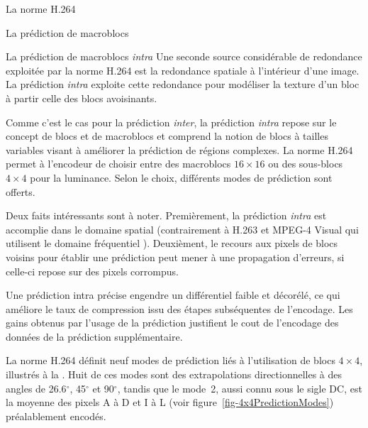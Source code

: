 \begin{chapter}{La norme H.264}
\begin{section}{La prédiction de macroblocs}
\begin{subsection}{La prédiction de macroblocs \textit{intra}}
Une seconde source considérable de redondance exploitée par la norme H.264 est
la redondance spatiale à l'intérieur d'une image. La prédiction \textit{intra}
exploite cette redondance pour modéliser la texture d'un bloc à partir celle des
blocs avoisinants.

Comme c'est le cas pour la prédiction \textit{inter}, la prédiction
\textit{intra} repose sur le concept de blocs et de macroblocs et comprend la
notion de blocs à tailles variables visant à améliorer la prédiction de régions
complexes. La norme H.264 permet à l'encodeur de choisir entre des macroblocs
$16 \times 16$ ou des sous-blocs $4 \times 4$ pour la luminance. Selon le choix,
différents modes de prédiction sont offerts.

Deux faits intéressants sont à noter. Premièrement, la prédiction \textit{intra}
est accomplie dans le domaine spatial (contrairement à H.263 et MPEG-4 Visual
qui utilisent le domaine fréquentiel \citep{Wiegand2003}). Deuxièment, le
recours aux pixels de blocs voisins pour établir une prédiction peut mener à une
propagation d'erreurs, si celle-ci repose sur des pixels corrompus.

Une prédiction intra précise engendre un différentiel faible et
décorélé, ce qui améliore le taux de compression issu des étapes subséquentes
de l'encodage. Les gains obtenus par l'usage de la prédiction justifient le cout
de l'encodage des données de la prédiction supplémentaire.

La norme H.264 définit neuf modes de prédiction liés à l'utilisation de blocs
$ 4 \times 4$, illustrés à la . Huit de ces modes
sont des extrapolations directionnelles à des angles de 26.6$^\circ$, 45$^\circ$
et 90$^\circ$, tandis que le mode~2, aussi connu sous le sigle DC, est la
moyenne des pixels A à D et I à L (voir figure~\ref{fig-4x4PredictionModes})
préalablement encodés.


\end{subsection}
\end{section}
\end{chapter}
